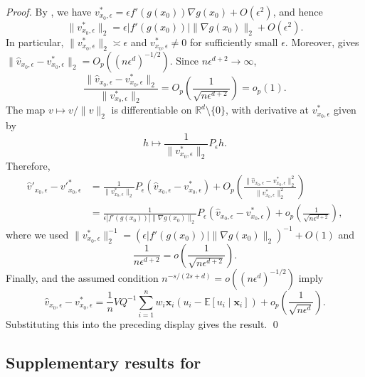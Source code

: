 \documentclass[11pt]{article}
\begin{document}
\begin{appendices}
\noindent \textit{Proof.} By , we have $v^*_{x_0,\epsilon}=\epsilon f'(g(x_0))\nabla g(x_0)+O(\epsilon^2)$, and hence
\[
    \|v^*_{x_0,\epsilon}\|_2
    =
    \epsilon |f'(g(x_0))|\|\nabla g(x_0)\|_2+O(\epsilon^2).
\]
In particular, $\|v^*_{x_0,\epsilon}\|_2\asymp\epsilon$ and $v^*_{x_0,\epsilon}\neq0$ for sufficiently small $\epsilon$. Moreover,  gives $\|\hat v_{x_0,\epsilon}-v^*_{x_0,\epsilon}\|_2=O_p((n\epsilon^d)^{-1/2})$. Since $n\epsilon^{d+2}\rightarrow\infty$,
\[
    \frac{\|\hat v_{x_0,\epsilon}-v^*_{x_0,\epsilon}\|_2}{\|v^*_{x_0,\epsilon}\|_2}
    =
    O_p\left(\frac{1}{\sqrt{n\epsilon^{d+2}}}\right)
    =
    o_p(1).
\]
The map $v\mapsto v/\|v\|_2$ is differentiable on $\mathbb{R}^d\setminus\{0\}$, with derivative at $v^*_{x_0,\epsilon}$ given by
\[
    h\mapsto \frac{1}{\|v^*_{x_0,\epsilon}\|_2}P_\epsilon h.
\]
Therefore,
\begin{align*}
    \hat v'_{x_0,\epsilon}-v'^*_{x_0,\epsilon}
    &=
    \frac{1}{\|v^*_{x_0,\epsilon}\|_2}
    P_\epsilon(\hat v_{x_0,\epsilon}-v^*_{x_0,\epsilon})
    +
    O_p\left(
    \frac{\|\hat v_{x_0,\epsilon}-v^*_{x_0,\epsilon}\|_2^2}
    {\|v^*_{x_0,\epsilon}\|_2^2}
    \right) \\
    &=
    \frac{1}{\epsilon |f'(g(x_0))|\|\nabla g(x_0)\|_2}
    P_\epsilon(\hat v_{x_0,\epsilon}-v^*_{x_0,\epsilon})
    +
    o_p\left(\frac{1}{\sqrt{n\epsilon^{d+2}}}\right),
\end{align*}
where we used $\|v^*_{x_0,\epsilon}\|_2^{-1}=(\epsilon |f'(g(x_0))|\|\nabla g(x_0)\|_2)^{-1}+O(1)$ and
\[
    \frac{1}{n\epsilon^{d+2}}
    =
    o\left(\frac{1}{\sqrt{n\epsilon^{d+2}}}\right).
\]
Finally,  and the assumed condition $n^{-s/(2s+d)}=o((n\epsilon^d)^{-1/2})$ imply
\[
    \hat v_{x_0,\epsilon}-v^*_{x_0,\epsilon}
    =
    \frac{1}{n}VQ^{-1}\sum_{i=1}^n
    w_i\boldsymbol{x}_i(u_i-\mathbb{E}[u_i\mid \boldsymbol{x}_i])
    +
    o_p\left(\frac{1}{\sqrt{n\epsilon^d}}\right).
\]
Substituting this into the preceding display gives the result.
\qed{}


\subsection{Supplementary results for }


\end{appendices}
\end{document}
